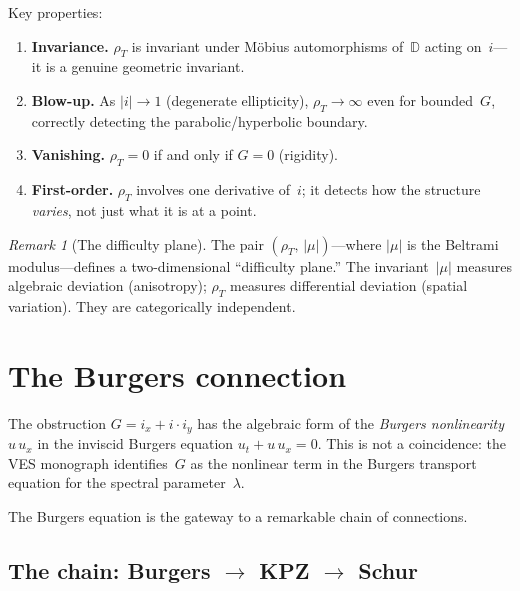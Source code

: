 \documentclass[11pt]{article}
\newcommand{\D}{\mathbb{D}}
\newcommand{\rhoT}{\rho_T}
\theoremstyle{plain}
\theoremstyle{definition}
\theoremstyle{remark}
\newtheorem{remark}{Remark}
\begin{document}
Key properties:
\begin{enumerate}[label=(\roman*)]
  \item \textbf{Invariance.} $\rhoT$ is invariant under M\"obius
    automorphisms of~$\D$ acting on~$i$---it is a genuine geometric
    invariant.
  \item \textbf{Blow-up.} As $|i|\to 1$ (degenerate ellipticity),
    $\rhoT\to\infty$ even for bounded~$G$, correctly detecting
    the parabolic/hyperbolic boundary.
  \item \textbf{Vanishing.} $\rhoT=0$ if and only if $G=0$
    (rigidity).
  \item \textbf{First-order.} $\rhoT$ involves one derivative
    of~$i$; it detects how the structure \emph{varies}, not just
    what it is at a point.
\end{enumerate}

\begin{remark}[The difficulty plane]
The pair $(\rhoT,\,|\mu|)$---where $|\mu|$ is the Beltrami
modulus---defines a two-dimensional ``difficulty plane.'' The
invariant~$|\mu|$ measures algebraic deviation (anisotropy);
$\rhoT$ measures differential deviation (spatial variation). They
are categorically independent.
\end{remark}


\section{The Burgers connection}

The obstruction $G = i_x + i\cdot i_y$ has the algebraic form of the
\emph{Burgers nonlinearity}~$u\,u_x$ in the inviscid Burgers equation
$u_t + u\,u_x = 0$. This is not a coincidence: the VES monograph
identifies~$G$ as the nonlinear term in the Burgers transport equation
for the spectral parameter~$\lambda$.

The Burgers equation is the gateway to a remarkable chain of
connections.

\subsection{The chain: Burgers $\to$ KPZ $\to$ Schur}
\end{document}
